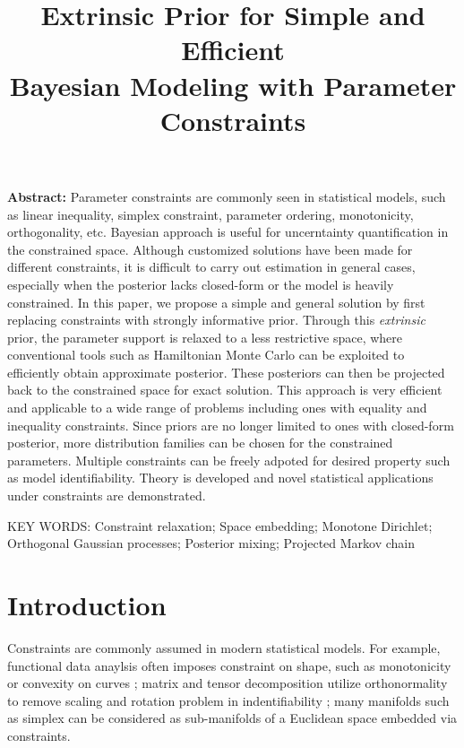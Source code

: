 \documentclass[10pt]{article}
\title{\textbf{Extrinsic Prior for Simple and Efficient\\ Bayesian Modeling with Parameter Constraints}}
\date{}
\begin{document}
\maketitle


{\bf Abstract:} Parameter constraints are commonly seen in statistical models, such as linear inequality, simplex constraint, parameter ordering, monotonicity, orthogonality, etc. Bayesian approach is useful for uncerntainty quantification in the constrained space. Although customized solutions have been made for different constraints, it is difficult to carry out estimation in general cases, especially when the posterior lacks closed-form or the model is heavily constrained. In this paper, we propose a simple and general solution by first replacing constraints with strongly informative prior. Through this {\it extrinsic} prior, the parameter support is relaxed to a less restrictive space, where conventional tools such as Hamiltonian Monte Carlo can be exploited to efficiently obtain approximate posterior.  These posteriors can then be projected back to the constrained space for exact solution. This approach is very efficient and applicable to a wide range of problems including ones with equality and inequality constraints. Since priors are no longer limited to ones with closed-form posterior, more distribution families can be chosen for the constrained parameters. Multiple constraints can be freely adpoted for desired property such as model identifiability. Theory is developed and novel statistical applications under constraints are demonstrated.
\vskip 12pt

{\noindent  KEY WORDS:  Constraint relaxation; Space embedding; Monotone Dirichlet; Orthogonal Gaussian processes; Posterior mixing; Projected Markov chain}
{}

\section{Introduction}

Constraints are commonly assumed in modern statistical models. For example, functional data anaylsis often imposes constraint on shape, such as monotonicity or convexity on curves \citep{kelly1990monotone}; matrix and tensor decomposition utilize orthonormality to remove scaling and rotation problem in indentifiability \citep{uschmajew2010well}; many manifolds such as simplex can be considered as sub-manifolds of a Euclidean space embedded via  constraints.
\end{document}
